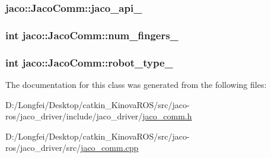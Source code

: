 \subsubsection[{\texorpdfstring{jaco\+\_\+api\+\_\+}{jaco_api_}}]{ jaco\+::\+Jaco\+Comm\+::jaco\+\_\+api\+\_\+\hspace{0.3cm}{\ttfamily [private]}}\hypertarget{classjaco_1_1JacoComm_a8d1510c941f28a4e8f921691d4fd2248}{}\label{classjaco_1_1JacoComm_a8d1510c941f28a4e8f921691d4fd2248}
\subsubsection[{\texorpdfstring{num\+\_\+fingers\+\_\+}{num_fingers_}}]{\setlength{\rightskip}{0pt plus 5cm}int jaco\+::\+Jaco\+Comm\+::num\+\_\+fingers\+\_\+\hspace{0.3cm}{\ttfamily [private]}}\hypertarget{classjaco_1_1JacoComm_a5812c7504d90ec6016c40cba097ba1bb}{}\label{classjaco_1_1JacoComm_a5812c7504d90ec6016c40cba097ba1bb}
\subsubsection[{\texorpdfstring{robot\+\_\+type\+\_\+}{robot_type_}}]{\setlength{\rightskip}{0pt plus 5cm}int jaco\+::\+Jaco\+Comm\+::robot\+\_\+type\+\_\+\hspace{0.3cm}{\ttfamily [private]}}\hypertarget{classjaco_1_1JacoComm_afb603f289e6ed8855cbeb0d0b1400829}{}\label{classjaco_1_1JacoComm_afb603f289e6ed8855cbeb0d0b1400829}


The documentation for this class was generated from the following files\+:\begin{DoxyCompactItemize}
\item 
D\+:/\+Longfei/\+Desktop/catkin\+\_\+\+Kinova\+R\+O\+S/src/jaco-\/ros/jaco\+\_\+driver/include/jaco\+\_\+driver/\hyperlink{jaco__comm_8h}{jaco\+\_\+comm.\+h}\item 
D\+:/\+Longfei/\+Desktop/catkin\+\_\+\+Kinova\+R\+O\+S/src/jaco-\/ros/jaco\+\_\+driver/src/\hyperlink{jaco__comm_8cpp}{jaco\+\_\+comm.\+cpp}\end{DoxyCompactItemize}
